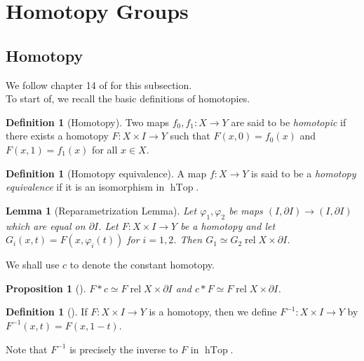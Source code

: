 \documentclass[reqno]{amsart}
\newtheorem{lemma}[theorem]{Lemma}
\newtheorem{proposition}[theorem]{Proposition}
\theoremstyle{definition}
\newtheorem{definition}[theorem]{Definition}
\theoremstyle{remark}
\DeclareMathOperator{\hTop}{hTop}
\DeclareMathOperator{\rel}{rel}
\begin{document}
\newpage

\section{Homotopy Groups}

\subsection{Homotopy}
We follow chapter 14 of \cite{Bredon} for this subsection.\\

To start of, we recall the basic definitions of homotopies.

\begin{definition}[Homotopy]
    Two maps $f_0, f_1 \colon X \to Y$ are said to
    be \textit{homotopic} if there exists a homotopy
    $F \colon X \times I \to Y$ such that
    $F(x,0) = f_0(x)$ and $F(x,1) = f_1(x)$ for
    all $x \in X$.
\end{definition}

\begin{definition}[Homotopy equivalence]
    A map $f \colon X \to Y$ is said to be a \textit{homotopy
    equivalence} if it is an isomorphism in
    $\hTop$.
\end{definition}

\begin{lemma}[Reparametrization Lemma]
    Let $\varphi_1, \varphi_2$ be maps
    $\left( I, \partial I \right) \to 
    \left( I, \partial I \right) $ which are equal on
    $\partial I$. Let
    $F \colon X \times I \to Y$ be a homotopy and let
    $G_i (x,t) = F\left( x, \varphi_i(t) \right) $ for
    $i = 1,2$. Then $G_1 \simeq G_2 \rel
    X \times \partial I$.
\end{lemma}

We shall use $c$ to denote the constant homotopy.

\begin{proposition}[]
    $F * c \simeq F \rel X \times \partial I$ and
    $c * F \simeq F \rel X \times \partial I$.
\end{proposition}

\begin{definition}[]
    If $F \colon X \times I \to Y$ is a homotopy, then we
    define $F^{-1} \colon X \times I \to Y$ by
    $F^{-1}\left( x,t \right) = F(x,1-t)$. 
\end{definition}

Note that $F^{-1}$ is precisely the inverse
to $F$ in $\hTop$.
\end{document}
